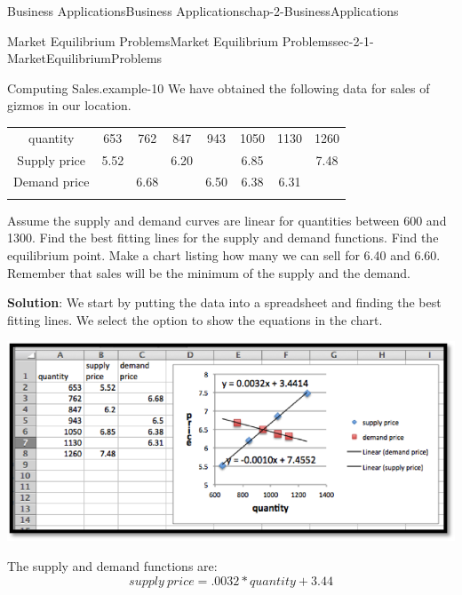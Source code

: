 \documentclass[oneside,10pt,]{book}
\newcommand{\terminology}[1]{\textbf{#1}}
\numberwithin{equation}{section}
\newcommand{\hrulethin}  {\noalign{\hrule height 0.04em}}
\newcommand{\hrulemedium}{\noalign{\hrule height 0.07em}}
\newcommand{\hrulethick} {\noalign{\hrule height 0.11em}}
\begin{document}
\begin{chapterptx}{Business Applications}{}{Business Applications}{}{}{chap-2-BusinessApplications}
\begin{sectionptx}{Market Equilibrium Problems}{}{Market Equilibrium Problems}{}{}{sec-2-1-MarketEquilibriumProblems}
\begin{example}{Computing Sales.}{example-10}%
\hypertarget{p-577}{}%
We have obtained the following data for sales of gizmos in our location.%
\begin{sidebyside}{1}{0}{0}{0}%
\begin{sbspanel}{1}%
{\centering%
\begin{tabular}{cccccccc}\hrulethick
quantity&653&762&847&943&1050&1130&1260\tabularnewline\hrulethin
Supply price&5.52&&6.20&&6.85&&7.48\tabularnewline\hrulemedium
Demand price&&6.68&&6.50&6.38&6.31&\tabularnewline\hrulemedium
\end{tabular}
\par}
\end{sbspanel}%
\end{sidebyside}%
\par
\hypertarget{p-578}{}%
Assume the supply and demand curves are linear for quantities between 600 and 1300.  Find the best fitting lines for the supply and demand functions.  Find the equilibrium point.  Make a chart listing how many we can sell for \textdollar{}6.40 and \textdollar{}6.60.  Remember that sales will be the minimum of the supply and the demand.%
\par
\hypertarget{p-579}{}%
\terminology{Solution}: We start by putting the data into a spreadsheet and finding the best fitting lines.  We select the option to show the equations in the chart. \begin{sidebyside}{1}{0.1}{0.1}{0}%
\begin{sbspanel}{0.8}%
\includegraphics[width=1\linewidth]{images/sec2-1-8.png}
\end{sbspanel}%
\end{sidebyside}%
%
\par
\hypertarget{p-580}{}%
The supply and demand functions are:%
%
\begin{equation*}
supply\  price=.0032*quantity+3.44
\end{equation*}

\end{example}
\end{sectionptx}
\end{chapterptx}
\end{document}
